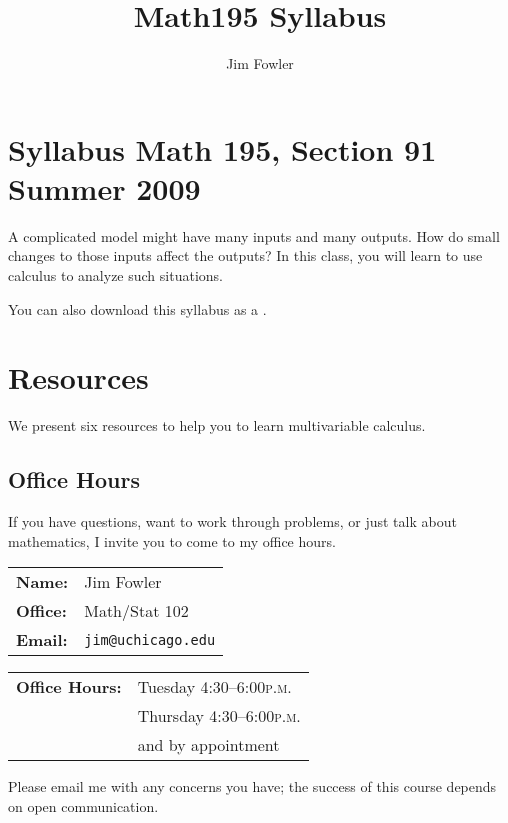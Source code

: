 \documentclass[12pt,letterpaper]{article}
\title{Math195 Syllabus}
\author{Jim Fowler}
\newcommand{\peem}{\textsc{p.m.}}
\begin{document}
\section*{\Large\sf Syllabus\hfill
Math 195, Section 91\hfill
Summer 2009}

A complicated model might have many inputs and many outputs.  How do
small changes to those inputs affect the outputs?  In this class, you
will learn to use calculus to analyze such situations.

\begin{htmlonly}
You can also download this syllabus as a .
\end{htmlonly}

\section*{Resources}

We present six resources to help you to learn multivariable calculus.

\subsection*{Office Hours}
If you have questions, want to work through problems, or just talk
about mathematics, I invite you to come to my office hours.
\begin{multicols}{2}
\begin{tabular}{ll}
\textbf{Name:} & Jim Fowler \\
\textbf{Office:} & Math/Stat 102 \\
\textbf{Email:} & \texttt{jim@uchicago.edu}
\end{tabular}

\begin{tabular}{ll}
\textbf{Office Hours:} & Tuesday 4:30--6:00\peem \\
& Thursday 4:30--6:00\peem \\
& and by appointment
\end{tabular}
\end{multicols}
\noindent
Please email me with any concerns you have; the success of this course
depends on open communication.

\end{document}
